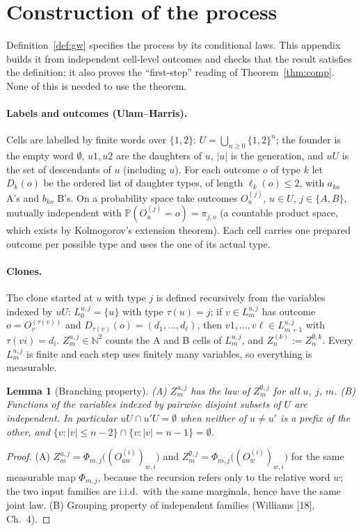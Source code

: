 \documentclass[11pt]{article}
\newtheorem{lemma}[theorem]{Lemma}
\theoremstyle{definition}
\theoremstyle{remark}
\newcommand{\Prob}{\mathbb{P}}
\newcommand{\N}{\mathbb{N}}
\begin{document}
\appendix
\section{Construction of the process}\label{app:construction}
Definition~\ref{def:gw} specifies the process by its conditional laws. This appendix builds it from independent cell-level outcomes and checks that the result satisfies the definition; it also proves the ``first-step'' reading of Theorem~\ref{thm:comp}. None of this is needed to use the theorem.

\paragraph{Labels and outcomes (Ulam--Harris).} Cells are labelled by finite words over $\{1,2\}$: $U=\bigcup_{n\ge0}\{1,2\}^n$; the founder is the empty word $\emptyset$, $u1,u2$ are the daughters of $u$, $|u|$ is the generation, and $uU$ is the set of descendants of $u$ (including $u$). For each outcome $o$ of type $k$ let $D_k(o)$ be the ordered list of daughter types, of length $\ell_k(o)\le2$, with $a_{ko}$ A's and $b_{ko}$ B's. On a probability space take outcomes $O^{(j)}_u$, $u\in U$, $j\in\{A,B\}$, mutually independent with $\Prob(O^{(j)}_u=o)=\pi_{j,o}$ (a countable product space, which exists by Kolmogorov's extension theorem). Each cell carries one prepared outcome per possible type and uses the one of its actual type.

\paragraph{Clones.} The clone started at $u$ with type $j$ is defined recursively from the variables indexed by $uU$: $L^{u,j}_0=\{u\}$ with type $\tau(u)=j$; if $v\in L^{u,j}_m$ has outcome $o=O^{(\tau(v))}_v$ and $D_{\tau(v)}(o)=(d_1,\dots,d_\ell)$, then $v1,\dots,v\ell\in L^{u,j}_{m+1}$ with $\tau(vi)=d_i$. $Z^{u,j}_m\in\N^2$ counts the A and B cells of $L^{u,j}_m$, and $Z^{(k)}_n:=Z^{\emptyset,k}_n$. Every $L^{u,j}_m$ is finite and each step uses finitely many variables, so everything is measurable.

\begin{lemma}[Branching property]\label{lem:branching}
(A) $Z^{u,j}_m$ has the law of $Z^{\emptyset,j}_m$ for all $u$, $j$, $m$. (B) Functions of the variables indexed by pairwise disjoint subsets of $U$ are independent. In particular $uU\cap u'U=\emptyset$ when neither of $u\ne u'$ is a prefix of the other, and $\{v:|v|\le n-2\}\cap\{v:|v|=n-1\}=\emptyset$.
\end{lemma}
\begin{proof}
(A) $Z^{u,j}_m=\Phi_{m,j}\big((O^{(i)}_{uw})_{w,i}\big)$ and $Z^{\emptyset,j}_m=\Phi_{m,j}\big((O^{(i)}_w)_{w,i}\big)$ for the same measurable map $\Phi_{m,j}$, because the recursion refers only to the relative word $w$; the two input families are i.i.d.\ with the same marginals, hence have the same joint law. (B) Grouping property of independent families (Williams [18], Ch.~4).
\end{proof}
\end{document}
